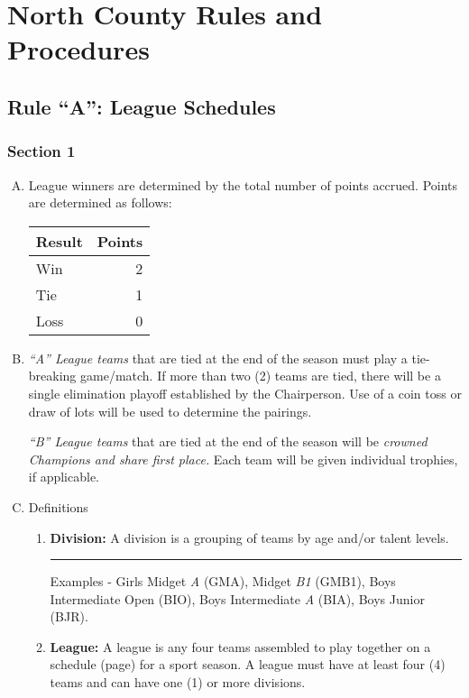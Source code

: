 \chapter{North County Rules and Procedures}
\label{chap:rules}
\section{Rule ``A'': League Schedules}
\label{sec:rules-a}
\subsection{Section 1}
\label{ssec:rules-a-1}
\begin{enumerate}[A.]
    \item League winners are determined by the total number of points accrued.  Points are determined as follows:
    \begin{center}
        \begin{tabular}{ l r }
            Result & Points \\
            \hline
            Win & 2 \\
            Tie & 1 \\
            Loss & 0 \\
        \end{tabular}
    \end{center}
    \item {\em “A” League teams} that are tied at the end of the season must play a tie-breaking game/match. If more than two (2) teams are tied, there will be a single elimination playoff established by the Chairperson. Use of a coin toss or 	draw of lots will be used to determine the pairings.
    
    {\em “B” League teams} that are tied at the end of the season will be {\em crowned Champions and share first place.}  Each team will be given individual trophies, if applicable.   

    \item Definitions
    \begin{enumerate}[1.]
        \item \textbf{Division:}  A division is a grouping of teams by age and/or talent levels.
        \plainbreak{1}
        Examples - Girls Midget {\em A} (GMA), Midget {\em B1} (GMB1), Boys Intermediate Open (BIO), Boys Intermediate {\em A} (BIA), Boys Junior (BJR).

        \item \textbf{League:}  A league is any four teams assembled to play together on a schedule (page) for a sport season.  A league must have at least four (4) teams and can have one (1) or more divisions.
    \end{enumerate}
\end{enumerate}

